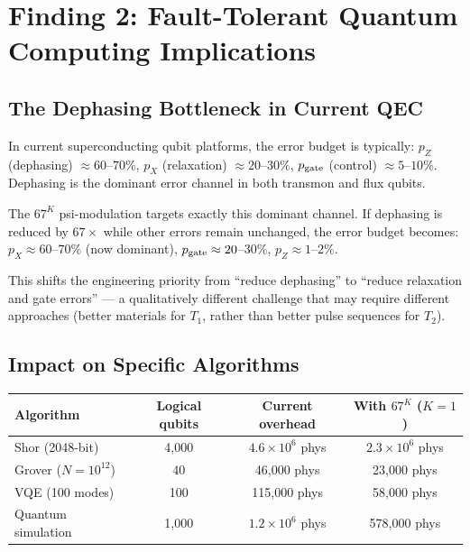 \documentclass[11pt]{article}
\theoremstyle{definition}
\theoremstyle{remark}
\newcommand{\ee}[1]{\times 10^{#1}}
\begin{document}
\section{Finding 2: Fault-Tolerant Quantum Computing Implications}
\label{sec:ftqc}

\subsection{The Dephasing Bottleneck in Current QEC}

In current superconducting qubit platforms, the error budget is
typically: $p_Z$ (dephasing) $\approx 60$--$70\%$, $p_X$ (relaxation)
$\approx 20$--$30\%$, $p_{\rm gate}$ (control) $\approx 5$--$10\%$.
Dephasing is the dominant error channel in both transmon and flux
qubits.

The $67^K$ psi-modulation targets exactly this dominant channel. If
dephasing is reduced by $67\times$ while other errors remain unchanged,
the error budget becomes: $p_X \approx 60$--$70\%$ (now dominant),
$p_{\rm gate} \approx 20$--$30\%$, $p_Z \approx 1$--$2\%$.

This shifts the engineering priority from ``reduce dephasing'' to
``reduce relaxation and gate errors'' --- a qualitatively different
challenge that may require different approaches (better materials for
$T_1$, rather than better pulse sequences for $T_2$).

\subsection{Impact on Specific Algorithms}

\begin{center}
\begin{tabular}{@{}p{3cm}ccc@{}}
\toprule
Algorithm & Logical qubits & Current overhead & With $67^K$ ($K=1$) \\
\midrule
Shor (2048-bit) & 4{,}000 & $4.6\ee{6}$ phys & $2.3\ee{6}$ phys \\
Grover ($N=10^{12}$) & 40 & 46{,}000 phys & 23{,}000 phys \\
VQE (100 modes) & 100 & 115{,}000 phys & 58{,}000 phys \\
Quantum simulation & 1{,}000 & $1.2\ee{6}$ phys & 578{,}000 phys \\
\bottomrule
\end{tabular}
\end{center}
\end{document}
